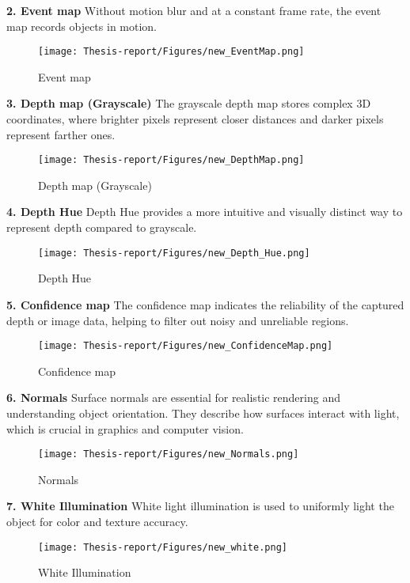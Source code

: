 \documentclass[12pt]{article}
\begin{document}
\noindent\textbf{2. Event map} Without motion blur and at a constant frame rate, the event map records objects in motion.
\begin{figure}[H]
    \centering
    \texttt{[image: Thesis-report/Figures/new\_EventMap.png]}
    \caption{Event map}
    \label{fig:eventmap}
\end{figure}

\noindent\textbf{3. Depth map (Grayscale)} The grayscale depth map stores complex 3D coordinates, where brighter pixels represent closer distances and darker pixels represent farther ones.
\begin{figure}[H]
    \centering
    \texttt{[image: Thesis-report/Figures/new\_DepthMap.png]}
    \caption{Depth map (Grayscale)}
    \label{fig:depthmap_gray}
\end{figure}

\noindent\textbf{4. Depth Hue} Depth Hue provides a more intuitive and visually distinct way to represent depth compared to grayscale.
\begin{figure}[H]
    \centering
    \texttt{[image: Thesis-report/Figures/new\_Depth\_Hue.png]}
    \caption{Depth Hue}
    \label{fig:depth_hue}
\end{figure}

\noindent\textbf{5. Confidence map} The confidence map indicates the reliability of the captured depth or image data, helping to filter out noisy and unreliable regions.
\begin{figure}[H]
    \centering
    \texttt{[image: Thesis-report/Figures/new\_ConfidenceMap.png]}
    \caption{Confidence map}
    \label{fig:confidence_map}
\end{figure}

\noindent\textbf{6. Normals} Surface normals are essential for realistic rendering and understanding object orientation. They describe how surfaces interact with light, which is crucial in graphics and computer vision.
\begin{figure}[H]
    \centering
    \texttt{[image: Thesis-report/Figures/new\_Normals.png]}
    \caption{Normals}
    \label{fig:normals}
\end{figure}

\noindent\textbf{7. White Illumination} White light illumination is used to uniformly light the object for color and texture accuracy.
\begin{figure}[H]
    \centering
    \texttt{[image: Thesis-report/Figures/new\_white.png]}
    \caption{White Illumination}
    \label{fig:white}
\end{figure}
\end{document}
